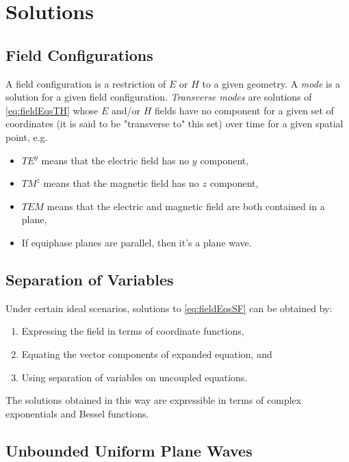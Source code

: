 \documentclass{article}
\numberwithin{equation}{section}
\begin{document}
\section{Solutions}
\subsection{Field Configurations}
A field configuration is a restriction of $E$ or $H$ to a given geometry. A \emph{mode} is a solution for a given field configuration.
\emph{Transverse modes} are solutions of \eqref{eq:fieldEqsTH} whose $E$ and/or $H$ fields have no component for a given set of coordinates (it is said to be "transverse to" this set) over time for a given spatial point, e.g.
\begin{itemize}
\item $TE^y$ means that the electric field has no $y$ component,
\item $TM^z$ means that the magnetic field has no $z$ component,
\item $TEM$ means that the electric and magnetic field are both contained in a plane,
\item If equiphase planes are parallel, then it's a plane wave.
\end{itemize}
\subsection{Separation of Variables}
Under certain ideal scenarios, solutions to \eqref{eq:fieldEqsSF} can be obtained by:
\begin{enumerate}
    \item Expressing the field in terms of coordinate functions,
    \item Equating the vector components of expanded equation, and
    \item Using separation of variables on uncoupled equations.
\end{enumerate}
The solutions obtained in this way are expressible in terms of complex exponentials and Bessel functions.
\subsection{Unbounded Uniform Plane Waves}
\end{document}
